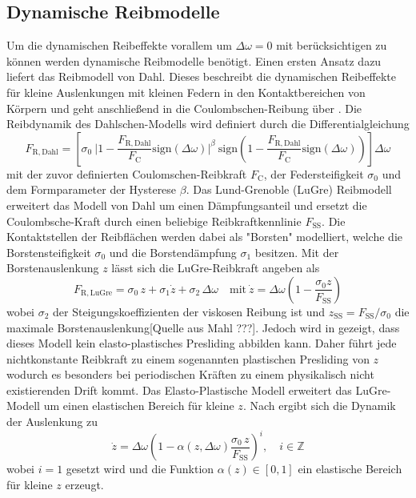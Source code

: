 \subsection{Dynamische Reibmodelle}
Um die dynamischen Reibeffekte vorallem um $\Delta\omega=0$ mit berücksichtigen zu können werden dynamische Reibmodelle benötigt. Einen ersten Ansatz dazu liefert das Reibmodell von Dahl. Dieses beschreibt die dynamischen Reibeffekte für kleine Auslenkungen mit kleinen Federn in den Kontaktbereichen von Körpern und geht anschließend in die Coulombschen-Reibung über \cite{Schroeder.2015}. Die Reibdynamik des Dahlschen-Modells wird definiert durch die Differentialgleichung
\begin{equation}
F_\mathrm{R,Dahl} = \left[\sigma_0\ \vert 1-\frac{F_\mathrm{R,Dahl}}{F_\mathrm{C}}\mathrm{sign}(\Delta\omega)\vert^\beta\ \mathrm{sign}\left( 1-\frac{F_\mathrm{R,Dahl}}{F_\mathrm{C}}\mathrm{sign}(\Delta\omega)\right)\right]\Delta\omega
\end{equation}
mit der zuvor definierten Coulomschen-Reibkraft $F_\mathrm{C}$, der Federsteifigkeit $\sigma_0$ und dem Formparameter der Hysterese $\beta$. Das Lund-Grenoble (LuGre) Reibmodell erweitert das Modell von Dahl um einen Dämpfungsanteil und ersetzt die Coulombsche-Kraft durch einen beliebige Reibkraftkennlinie $F_\mathrm{SS}$. Die Kontaktstellen der Reibflächen werden dabei als "Borsten"  modelliert, welche die Borstensteifigkeit $\sigma_0$ und die Borstendämpfung $\sigma_1$ besitzen. Mit der Borstenauslenkung $z$ lässt sich die LuGre-Reibkraft angeben als
\begin{equation}
F_\mathrm{R,LuGre} = \sigma_0\, z + \sigma_1 \dot{z} + \sigma_2\, \Delta \omega\quad \mathrm{mit}\  \dot{z}=\Delta\omega\left(1-\frac{\sigma_0 z}{F_\mathrm{SS}}\right)
\end{equation} 
wobei $\sigma_2$ der Steigungskoeffizienten der viskosen Reibung ist und $z_\mathrm{SS} = F_\mathrm{SS}/\sigma_0$ die maximale Borstenauslenkung[Quelle aus Mahl ???]. Jedoch wird in \cite{Dupont.2002} gezeigt, dass dieses Modell kein elasto-plastisches Presliding abbilden kann. Daher führt jede nichtkonstante Reibkraft zu einem sogenannten plastischen Presliding von $z$ wodurch es besonders bei periodischen Kräften zu einem physikalisch nicht existierenden Drift kommt. Das Elasto-Plastische Modell erweitert das LuGre-Modell um einen elastischen Bereich für kleine $z$. Nach \cite{Dupont.2000} ergibt sich die Dynamik der Auslenkung zu 
\begin{equation}
\dot{z} = \Delta \omega \left(1-\alpha(z,\Delta \omega)\frac{\sigma_0\,z}{F_\mathrm{SS}}\right)^i,\quad i\in \mathbb{Z}
\end{equation}
wobei $i=1$ gesetzt wird und die Funktion $\alpha(z)\in\left[0,1\right]$ ein elastische Bereich für kleine $z$ erzeugt. 

